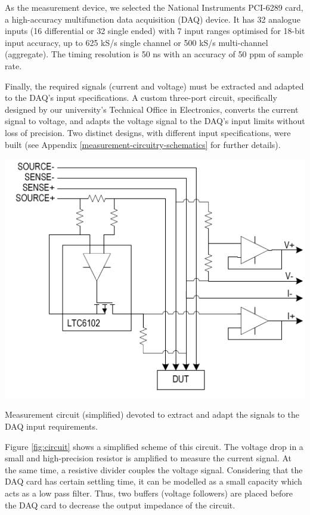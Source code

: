 \documentclass[twoside,nohyper]{tufte-book}
\begin{document}
As the measurement device, we selected the National Instruments PCI-6289 card, a high-accuracy multifunction data acquisition (DAQ) device. It has 32 analogue inputs (16 differential or 32 single ended) with 7 input ranges optimised for 18-bit input accuracy, up to 625 kS/s single channel or 500 kS/s multi-channel (aggregate). The timing resolution is 50 ns with an accuracy of 50 ppm of sample rate.

Finally, the required signals (current and voltage) must be extracted and adapted to the DAQ's input specifications. A custom three-port circuit, specifically designed by our university's Technical Office in Electronics, converts the current signal to voltage, and adapts the voltage signal to the DAQ's input limits without loss of precision. Two distinct designs, with different input specifications, were built (see Appendix \ref{measurement-circuitry-schematics} for further details).



\begin{marginfigure}[-1cm]

{\centering \includegraphics[width=1\linewidth]{img/03/circuit} 

}

\caption[Measurement circuit (simplified) devoted to extract and adapt the signals to the DAQ input requirements.]{Measurement circuit (simplified) devoted to extract and adapt the signals to the DAQ input requirements.}\label{fig:circuit}
\end{marginfigure}

Figure \ref{fig:circuit} shows a simplified scheme of this circuit. The voltage drop in a small and high-precision resistor is amplified to measure the current signal. At the same time, a resistive divider couples the voltage signal. Considering that the DAQ card has certain settling time, it can be modelled as a small capacity which acts as a low pass filter. Thus, two buffers (voltage followers) are placed before the DAQ card to decrease the output impedance of the circuit\cite[0pt]{ni2014}.
\end{document}
